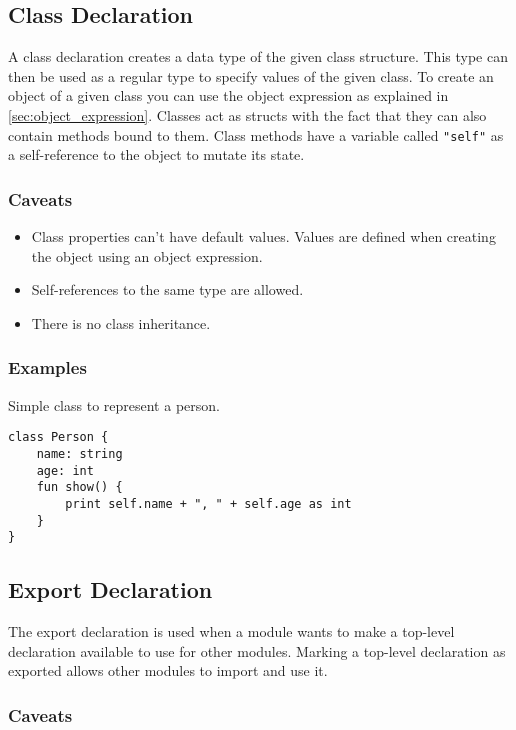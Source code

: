 \subsection{Class Declaration}

A class declaration creates a data type of the given class structure. This type can then be used as a regular type
to specify values of the given class. To create an object of a given class you can use the object expression as explained in \autoref{sec:object_expression}.
Classes act as structs with the fact that they can also contain methods bound to them. Class methods have a variable called \texttt{"self"}
as a self-reference to the object to mutate its state.

\subsubsection{Caveats}

\begin{itemize}
    \item Class properties can't have default values. Values are defined when creating the object using an object expression.
    \item Self-references to the same type are allowed.
    \item There is no class inheritance.
\end{itemize}

\subsubsection{Examples}

Simple class to represent a person.
\begin{lstlisting}
class Person {
    name: string
    age: int
    fun show() {
        print self.name + ", " + self.age as int
    }
}
\end{lstlisting}

\subsection{Export Declaration}

The export declaration is used when a module wants to make a top-level declaration available to use for other
modules. Marking a top-level declaration as exported allows other modules to import and use it.

\subsubsection{Caveats}


